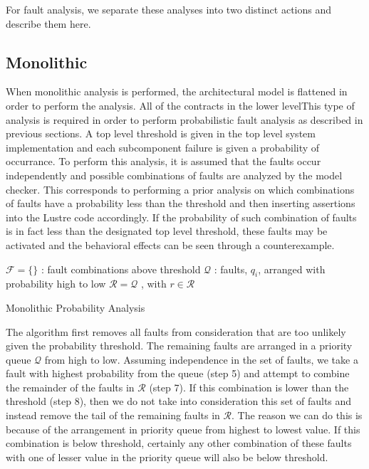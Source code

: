 For fault analysis, we separate these analyses into two distinct actions and describe them here.

\subsection{Monolithic}
When monolithic analysis is performed, the architectural model is flattened in order to perform the analysis. All of the contracts in the lower levelThis type of analysis is required in order to perform probabilistic fault analysis as described in previous sections. A top level threshold is given in the top level system implementation and each subcomponent failure is given a probability of occurrance. To perform this analysis, it is assumed that the faults occur independently and possible combinations of faults are analyzed by the model checker. This corresponds to performing a prior analysis on which combinations of faults have a probability less than the threshold and then inserting assertions into the Lustre code accordingly. If the probability of such combination of faults is in fact less than the designated top level threshold, these faults may be activated and the behavioral effects can be seen through a counterexample.  

\begin{algorithm}[H]
 $\mathcal{F} = \{\}$ : fault combinations above threshold \;
 $\mathcal{Q}$ : faults, $q_i$, arranged with probability high to low \;
 $\mathcal{R} = \mathcal{Q}$ , with $r \in \mathcal{R}$\;
 \caption{Monolithic Probability Analysis}
\end{algorithm}

The algorithm first removes all faults from consideration that are too unlikely given the probability threshold. The remaining faults are arranged in a priority queue $\mathcal{Q}$ from high to low. Assuming independence in the set of faults, we take a fault with highest probability from the queue (step 5) and attempt to combine the remainder of the faults in $\mathcal{R}$ (step 7). If this combination is lower than the threshold (step 8), then we do not take into consideration this set of faults and instead remove the tail of the remaining faults in $\mathcal{R}$. The reason we can do this is because of the arrangement in priority queue from highest to lowest value. If this combination is below threshold, certainly any other combination of these faults with one of lesser value in the priority queue will also be below threshold. 

